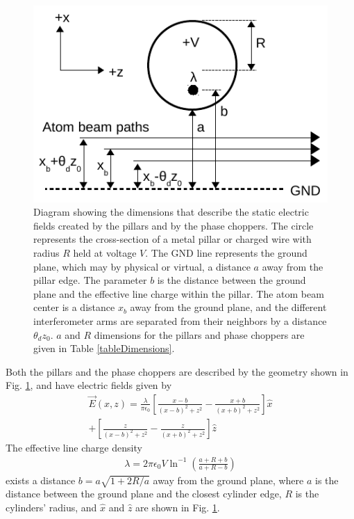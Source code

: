 \documentclass[twocolumn,prl,showpacs,superscriptaddress]{revtex4-1}   %
\newcommand{\figref}[1]{Fig. \ref{#1}}
\begin{document}
\begin{figure}
\includegraphics[width=\linewidth,keepaspectratio]{EDiagram1.pdf}
\caption{\label{EDiagram}Diagram showing the dimensions that describe the static electric fields created by the pillars and by the phase choppers. The circle represents the cross-section of a metal pillar or charged wire with radius $R$ held at voltage $V$. The GND line represents the ground plane, which may by physical or virtual, a distance $a$ away from the pillar edge. The parameter $b$ is the distance between the ground plane and the effective line charge within the pillar. The atom beam center is a distance $x_b$ away from the ground plane, and the different interferometer arms are separated from their neighbors by a distance $\theta_d z_0$. $a$ and $R$ dimensions for the pillars and phase choppers are given in Table \ref{tableDimensions}.}
\end{figure}

Both the pillars and the phase choppers are described by the geometry shown in \figref{EDiagram}, and have electric fields given by
\begin{align}
	\vec{E}(x,z) = \frac{\lambda}{\pi\epsilon_0}
	\left[	
		\frac{x-b}{(x-b)^2+z^2} - \frac{x+b}{(x+b)^2+z^2}
	\right] \hat{x} \nonumber \\
	+ 
	\left[	
		\frac{z}{(x-b)^2+z^2} - \frac{z}{(x+b)^2+z^2}
	\right] \hat{z}
	\label{EPillars}
\end{align}
The effective line charge density
\begin{align}
	\lambda = 2\pi\epsilon_0V\ln^{-1}
	\left(
		\frac{a+R+b}{a+R-b}
	\right)
	\label{lambda}
\end{align}
exists a distance $b = a\sqrt{1+2R/a}$ away from the ground plane, where $a$ is the distance between the ground plane and the closest cylinder edge, $R$ is the cylinders' radius, and $\hat{x}$ and $\hat{z}$ are shown in \figref{EDiagram}.
\end{document}
